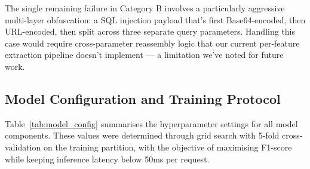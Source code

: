 \documentclass[journal,onecolumn]{IEEEtran}
\begin{document}
The single remaining failure in Category B involves a particularly aggressive multi-layer obfuscation: a SQL injection payload that's first Base64-encoded, then URL-encoded, then split across three separate query parameters. Handling this case would require cross-parameter reassembly logic that our current per-feature extraction pipeline doesn't implement --- a limitation we've noted for future work.

\subsection{Model Configuration and Training Protocol}

Table~\ref{tab:model_config} summarises the hyperparameter settings for all model components. These values were determined through grid search with 5-fold cross-validation on the training partition, with the objective of maximising F1-score while keeping inference latency below 50ms per request.

\begin{table}[h]
\centering
\caption{Model Component Hyperparameter Configuration}
\label{tab:model_config}
\end{table}
\end{document}
